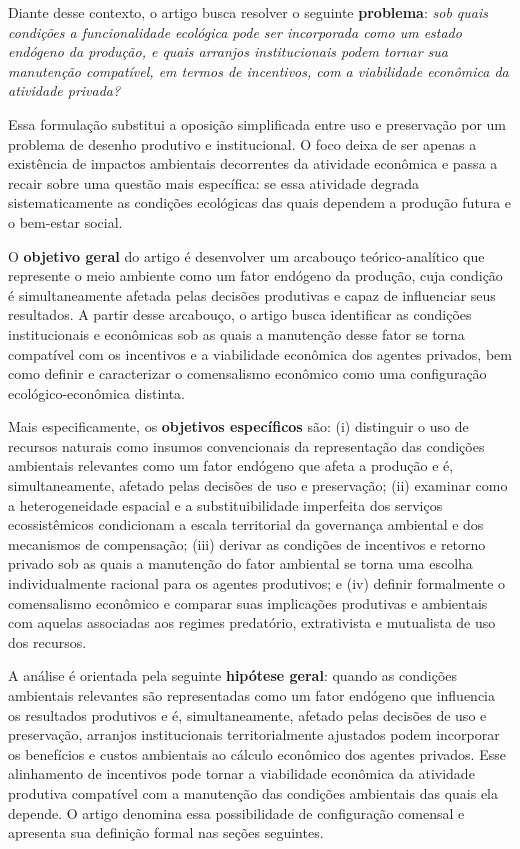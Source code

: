 Diante desse contexto, o artigo busca resolver o seguinte \textbf{problema}: \emph{sob quais condições a funcionalidade ecológica pode ser incorporada como um estado endógeno da produção, e quais arranjos institucionais podem tornar sua manutenção compatível, em termos de incentivos, com a viabilidade econômica da atividade privada?}

Essa formulação substitui a oposição simplificada entre uso e preservação por um problema de desenho produtivo e institucional. O foco deixa de ser apenas a existência de impactos ambientais decorrentes da atividade econômica e passa a recair sobre uma questão mais específica: se essa atividade degrada sistematicamente as condições ecológicas das quais dependem a produção futura e o bem-estar social.

O \textbf{objetivo geral} do artigo é desenvolver um arcabouço teórico-analítico que represente o meio ambiente como um fator endógeno da produção, cuja condição é simultaneamente afetada pelas decisões produtivas e capaz de influenciar seus resultados. A partir desse arcabouço, o artigo busca identificar as condições institucionais e econômicas sob as quais a manutenção desse fator se torna compatível com os incentivos e a viabilidade econômica dos agentes privados, bem como definir e caracterizar o comensalismo econômico como uma configuração ecológico-econômica distinta.

Mais especificamente, os \textbf{objetivos específicos} são: (i) distinguir o uso de recursos naturais como insumos convencionais da representação das condições ambientais relevantes como um fator endógeno que afeta a produção e é, simultaneamente, afetado pelas decisões de uso e preservação; (ii) examinar como a heterogeneidade espacial e a substituibilidade imperfeita dos serviços ecossistêmicos condicionam a escala territorial da governança ambiental e dos mecanismos de compensação; (iii) derivar as condições de incentivos e retorno privado sob as quais a manutenção do fator ambiental se torna uma escolha individualmente racional para os agentes produtivos; e (iv) definir formalmente o comensalismo econômico e comparar suas implicações produtivas e ambientais com aquelas associadas aos regimes predatório, extrativista e mutualista de uso dos recursos.


A análise é orientada pela seguinte \textbf{hipótese geral}: quando as condições ambientais relevantes são representadas como um fator endógeno que influencia os resultados produtivos e é, simultaneamente, afetado pelas decisões de uso e preservação, arranjos institucionais territorialmente ajustados podem incorporar os benefícios e custos ambientais ao cálculo econômico dos agentes privados. Esse alinhamento de incentivos pode tornar a viabilidade econômica da atividade produtiva compatível com a manutenção das condições ambientais das quais ela depende. O artigo denomina essa possibilidade de configuração comensal e apresenta sua definição formal nas seções seguintes. %

